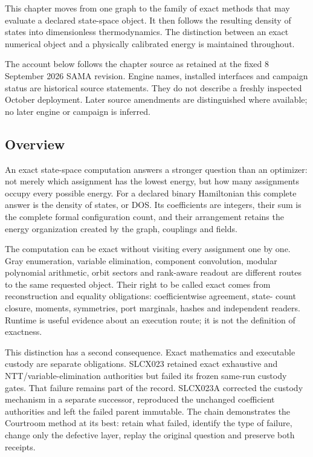 \label{viii-ch03-exact-state-spaces-and-thermodynamics}

This chapter moves from one graph to the family of exact methods that
may evaluate a declared state-space object. It then follows the
resulting density of states into dimensionless thermodynamics. The
distinction between an exact numerical object and a physically
calibrated energy is maintained throughout.

The account below follows the chapter source as retained at the fixed 8
September 2026 SAMA revision. Engine names, installed interfaces and
campaign status are historical source statements. They do not describe a
freshly inspected October deployment. Later source amendments are
distinguished where available; no later engine or campaign is inferred.

\subsection{Overview}\label{viii-ch03-overview}

An exact state-space computation answers a stronger question than an
optimizer: not merely which assignment has the lowest energy, but how
many assignments occupy every possible energy. For a declared binary
Hamiltonian this complete answer is the density of states, or DOS. Its
coefficients are integers, their sum is the complete formal
configuration count, and their arrangement retains the energy
organization created by the graph, couplings and fields.

The computation can be exact without visiting every assignment one by
one. Gray enumeration, variable elimination, component convolution,
modular polynomial arithmetic, orbit sectors and rank-aware readout are
different routes to the same requested object. Their right to be called
exact comes from reconstruction and equality obligations:
coefficientwise agreement, state- count closure, moments, symmetries,
port marginals, hashes and independent readers. Runtime is useful
evidence about an execution route; it is not the definition of
exactness.

This distinction has a second consequence. Exact mathematics and
executable custody are separate obligations. SLCX023 retained exact
exhaustive and NTT/variable-elimination authorities but failed its
frozen same-run custody gates. That failure remains part of the record.
SLCX023A corrected the custody mechanism in a separate successor,
reproduced the unchanged coefficient authorities and left the failed
parent immutable. The chain demonstrates the Courtroom method at its
best: retain what failed, identify the type of failure, change only the
defective layer, replay the original question and preserve both
receipts.

